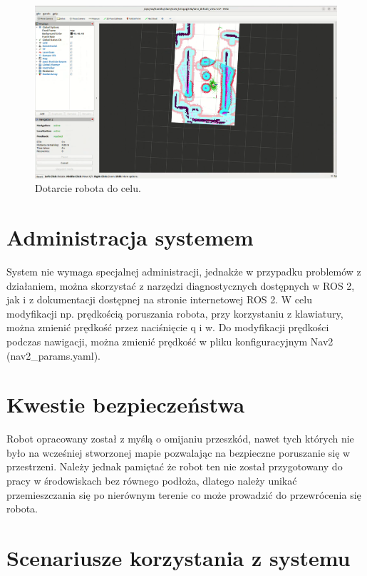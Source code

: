 \documentclass[a4paper,twoside,12pt]{book}
\begin{document}
\newpage
\begin{figure}[!hb]
	\centering
	\includegraphics[width=1\textwidth]{images/launch-nav6.png}
	\caption{Dotarcie robota do celu.}
	\label{fig:nav-map6}
\end{figure}

\section{Administracja systemem}
System nie wymaga specjalnej administracji, jednakże w przypadku problemów z działaniem, można skorzystać z narzędzi diagnostycznych dostępnych w ROS 2, jak i z dokumentacji dostępnej na stronie internetowej ROS 2. W celu modyfikacji np. prędkością poruszania robota, przy korzystaniu z klawiatury, można zmienić prędkość przez naciśnięcie q i w. Do modyfikacji prędkości podczas nawigacji, można zmienić prędkość w pliku konfiguracyjnym Nav2 (nav2\_params.yaml).
\section{Kwestie bezpieczeństwa}
Robot opracowany został z myślą o omijaniu przeszkód, nawet tych których nie było na wcześniej stworzonej mapie pozwalając na bezpieczne poruszanie się w przestrzeni.
Należy jednak pamiętać że robot ten nie został przygotowany do pracy w środowiskach bez równego podłoża, dlatego należy unikać przemieszczania się po nierównym terenie co może prowadzić do przewrócenia się robota.
\newpage
\section{Scenariusze korzystania z systemu}
\end{document}
